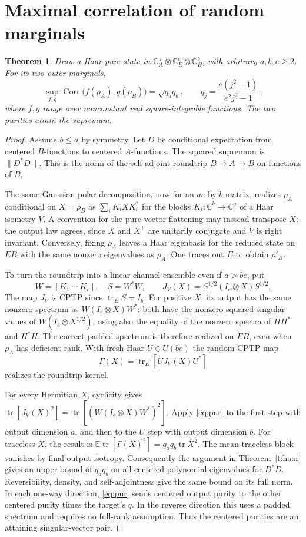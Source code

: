 \documentclass[11pt]{article}
\newtheorem{theorem}{Theorem}
\DeclareMathOperator{\tr}{tr}
\DeclareMathOperator{\Corr}{Corr}
\newcommand{\E}{\mathbb E}
\newcommand{\C}{\mathbb C}
\begin{document}
\section{Maximal correlation of random marginals}
\begin{theorem}\label{t:hgr}
Draw a Haar pure state in $\C^a_A\otimes\C^e_E\otimes\C^b_B$, with arbitrary $a,b,e\ge2$. For its two outer marginals,
\[
 \sup_{f,g}\Corr\big(f(\rho_A),g(\rho_B)\big)=\sqrt{q_aq_b},
 \qquad q_j=\frac{e(j^2-1)}{e^2j^2-1},
\]
where $f,g$ range over nonconstant real square-integrable functions. The two purities attain the supremum.
\end{theorem}
\begin{proof}
Assume $b\le a$ by symmetry. Let $D$ be conditional expectation from centered $B$-functions to centered $A$-functions. The squared supremum is $\|D^*D\|$. This is the norm of the self-adjoint roundtrip $B\to A\to B$ on functions of $B$.

The same Gaussian polar decomposition, now for an $ae$-by-$b$ matrix, realizes $\rho_A$ conditional on $X=\rho_B$ as $\sum_iK_i X K_i^*$ for the blocks $K_i:\C^b\to\C^a$ of a Haar isometry $V$. A convention for the pure-vector flattening may instead transpose $X$; the output law agrees, since $X$ and $X^\top$ are unitarily conjugate and $V$ is right invariant. Conversely, fixing $\rho_A$ leaves a Haar eigenbasis for the reduced state on $EB$ with the same nonzero eigenvalues as $\rho_A$. One traces out $E$ to obtain $\rho'_B$.

To turn the roundtrip into a linear-channel ensemble even if $a>be$, put
\[
 W=[K_1\ \cdots\ K_e],\quad S=W^*W,\qquad
 J_V(X)=S^{1/2}(I_e\otimes X)S^{1/2}.
\]
The map $J_V$ is CPTP since $\tr_E S=I_b$. For positive $X$, its output has the same nonzero spectrum as $W(I_e\otimes X)W^*$: both have the nonzero squared singular values of $W(I_e\otimes X^{1/2})$, using also the equality of the nonzero spectra of $HH^*$ and $H^*H$. The correct padded spectrum is therefore realized on $EB$, even when $\rho_A$ has deficient rank. With fresh Haar $U\in U(be)$ the random CPTP map
\[
 \Gamma(X)=\tr_E\!\left[U J_V(X)U^*\right]
\]
realizes the roundtrip kernel.

For every Hermitian $X$, cyclicity gives $\tr[J_V(X)^2]=\tr[(W(I_e\otimes X)W^*)^2]$. Apply \eqref{eq:pur} to the first step with output dimension $a$, and then to the $U$ step with output dimension $b$. For traceless $X$, the result is $\E\tr[\Gamma(X)^2]=q_aq_b\tr X^2$. The mean traceless block vanishes by final output isotropy. Consequently the argument in Theorem~\ref{t:haar} gives an upper bound of $q_aq_b$ on all centered polynomial eigenvalues for $D^*D$. Reversibility, density, and self-adjointness give the same bound on its full norm. In each one-way direction, \eqref{eq:pur} sends centered output purity to the other centered purity times the target's $q$. In the reverse direction this uses a padded spectrum and requires no full-rank assumption. Thus the centered purities are an attaining singular-vector pair.
\end{proof}
\end{document}
